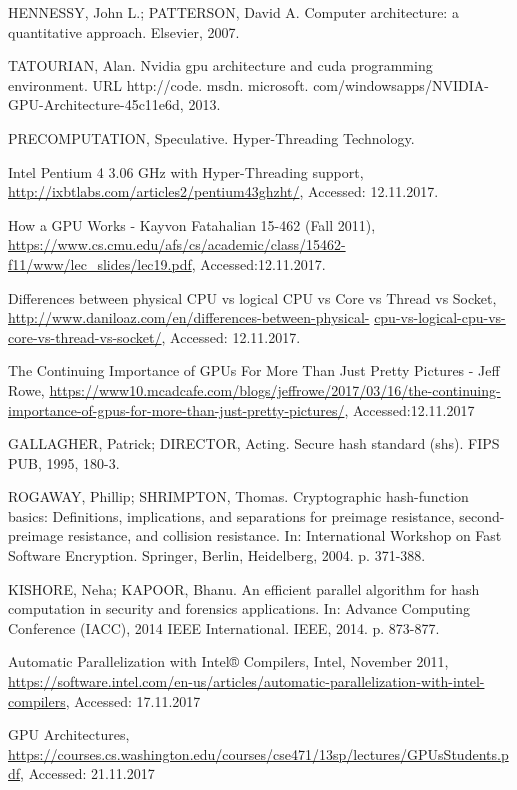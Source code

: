 \documentclass[conference]{IEEEtran}
\begin{document}
\ifCLASSOPTIONcaptionsoff
  \newpage
\fi


\begin{thebibliography}{1}

HENNESSY, John L.; PATTERSON, David A. Computer architecture: a quantitative approach. Elsevier, 2007.

TATOURIAN, Alan. Nvidia gpu architecture and cuda programming environment. URL http://code. msdn. microsoft. com/windowsapps/NVIDIA-GPU-Architecture-45c11e6d, 2013.

PRECOMPUTATION, Speculative. Hyper-Threading Technology.

Intel Pentium 4 3.06 GHz with Hyper-Threading support, \url{http://ixbtlabs.com/articles2/pentium43ghzht/}, Accessed: 12.11.2017.

How a GPU Works - Kayvon Fatahalian 15-462 (Fall 2011), \url{https://www.cs.cmu.edu/afs/cs/academic/class/15462-f11/www/lec_slides/lec19.pdf}, Accessed:12.11.2017.

Differences between physical CPU vs logical CPU vs Core vs Thread vs Socket, \url{http://www.daniloaz.com/en/differences-between-physical-} \url{cpu-vs-logical-cpu-vs-core-vs-thread-vs-socket/}, Accessed: 12.11.2017.

The Continuing Importance of GPUs For More Than Just Pretty Pictures - Jeff Rowe, \url{https://www10.mcadcafe.com/blogs/jeffrowe/2017/03/16/the-continuing-importance-of-gpus-for-more-than-just-pretty-pictures/}, Accessed:12.11.2017

GALLAGHER, Patrick; DIRECTOR, Acting. Secure hash standard (shs). FIPS PUB, 1995, 180-3.

ROGAWAY, Phillip; SHRIMPTON, Thomas. Cryptographic hash-function basics: Definitions, implications, and separations for preimage resistance, second-preimage resistance, and collision resistance. In: International Workshop on Fast Software Encryption. Springer, Berlin, Heidelberg, 2004. p. 371-388.

KISHORE, Neha; KAPOOR, Bhanu. An efficient parallel algorithm for hash computation in security and forensics applications. In: Advance Computing Conference (IACC), 2014 IEEE International. IEEE, 2014. p. 873-877.

Automatic Parallelization with Intel® Compilers, Intel, November 2011, \url{https://software.intel.com/en-us/articles/automatic-parallelization-with-intel-compilers}, Accessed: 17.11.2017

 GPU Architectures, \url{https://courses.cs.washington.edu/courses/cse471/13sp/lectures/GPUsStudents.pdf}, Accessed: 21.11.2017

\end{thebibliography}
\end{document}
